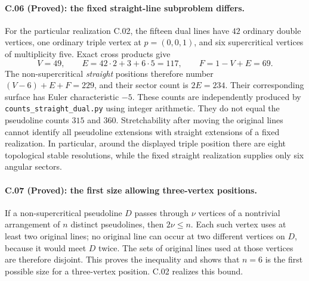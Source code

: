 \paragraph{C.06 (Proved): the fixed straight-line subproblem differs.}
For the particular realization C.02, the fifteen dual lines have
$42$ ordinary double vertices, one ordinary triple vertex at
$p=(0,0,1)$, and six supercritical vertices of multiplicity five.
Exact cross products give
\[
 V=49,\qquad E=42\cdot2+3+6\cdot5=117,\qquad
 F=1-V+E=69.
\]
The non-supercritical \emph{straight} positions therefore number
$(V-6)+E+F=229$, and their sector count is $2E=234$.
Their corresponding surface has Euler characteristic $-5$.
These counts are independently produced by
\texttt{counts\_straight\_dual.py} using integer arithmetic.
They do not equal the pseudoline counts $315$ and $360$.
Stretchability after moving the original lines cannot identify
all pseudoline extensions with straight extensions of a fixed
realization. In particular, around the displayed triple position
there are eight topological stable resolutions, while the fixed
straight realization supplies only six angular sectors.

\paragraph{C.07 (Proved): the first size allowing three-vertex positions.}
If a non-supercritical pseudoline $D$ passes through $\nu$ vertices
of a nontrivial arrangement of $n$ distinct pseudolines, then
$2\nu\le n$. Each such vertex uses at least two original lines;
no original line can occur at two different vertices on $D$,
because it would meet $D$ twice. The sets of original lines used
at those vertices are therefore disjoint. This proves the
inequality and shows that $n=6$ is the first possible size for
a three-vertex position. C.02 realizes this bound.
